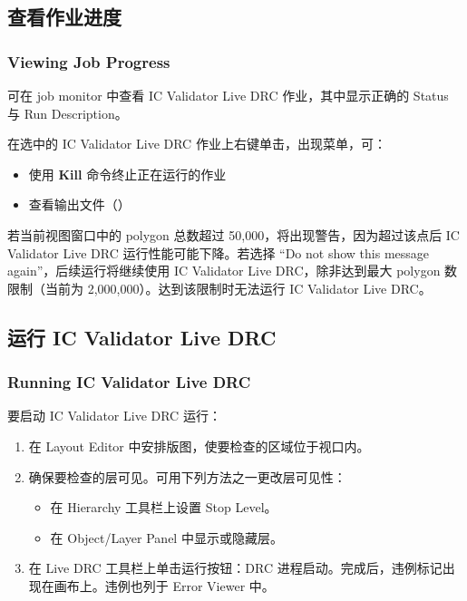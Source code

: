 \subsection{查看作业进度}
\subsubsection*{Viewing Job Progress}

可在 job monitor 中查看 IC Validator Live DRC 作业，其中显示正确的 Status 与 Run Description。


在选中的 IC Validator Live DRC 作业上右键单击，出现菜单，可：
\begin{itemize}
  \item 使用 \textbf{Kill} 命令终止正在运行的作业
  \item 查看输出文件（）
\end{itemize}


若当前视图窗口中的 polygon 总数超过 50{,}000，将出现警告，因为超过该点后 IC Validator Live DRC 运行性能可能下降。若选择 ``Do not show this message again''，后续运行将继续使用 IC Validator Live DRC，除非达到最大 polygon 数限制（当前为 2{,}000{,}000）。达到该限制时无法运行 IC Validator Live DRC。

\subsection{运行 IC Validator Live DRC}
\subsubsection*{Running IC Validator Live DRC}

要启动 IC Validator Live DRC 运行：
\begin{enumerate}
  \item 在 Layout Editor 中安排版图，使要检查的区域位于视口内。
  \item 确保要检查的层可见。可用下列方法之一更改层可见性：
  \begin{itemize}
    \item 在 Hierarchy 工具栏上设置 Stop Level。
    \item 在 Object/Layer Panel 中显示或隐藏层。
  \end{itemize}
  \item 在 Live DRC 工具栏上单击运行按钮：DRC 进程启动。完成后，违例标记出现在画布上。违例也列于 Error Viewer 中。
\end{enumerate}

